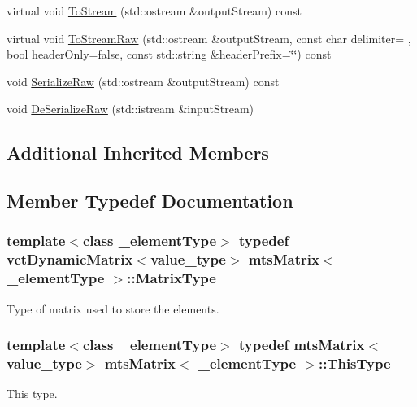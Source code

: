 \begin{DoxyCompactItemize}
virtual void \hyperlink{classmts_matrix_a87c2e010df3ccede587046196fa716fc}{To\+Stream} (std\+::ostream \&output\+Stream) const 
\item 
virtual void \hyperlink{classmts_matrix_a89f5816f6a704ffe48adc00edb8b3ef9}{To\+Stream\+Raw} (std\+::ostream \&output\+Stream, const char delimiter= \textquotesingle{} \textquotesingle{}, bool header\+Only=false, const std\+::string \&header\+Prefix=\char`\"{}\char`\"{}) const 
\item 
void \hyperlink{classmts_matrix_a49484e70fcf5261d86f962c6b1f2ce71}{Serialize\+Raw} (std\+::ostream \&output\+Stream) const 
\item 
void \hyperlink{classmts_matrix_aa079b220e4b5b4578c324a16e02d0eeb}{De\+Serialize\+Raw} (std\+::istream \&input\+Stream)
\end{DoxyCompactItemize}
\subsection*{Additional Inherited Members}


\subsection{Member Typedef Documentation}
\hypertarget{classmts_matrix_af0f57fd565d954a7485dcb26a384d64a}{}
\subsubsection[{Matrix\+Type}]{\setlength{\rightskip}{0pt plus 5cm}template$<$class \+\_\+element\+Type$>$ typedef {\bf vct\+Dynamic\+Matrix}$<$value\+\_\+type$>$ {\bf mts\+Matrix}$<$ \+\_\+element\+Type $>$\+::{\bf Matrix\+Type}}\label{classmts_matrix_af0f57fd565d954a7485dcb26a384d64a}
Type of matrix used to store the elements. \hypertarget{classmts_matrix_abebbde6e54b4a6e574c42a99bc015524}{}
\subsubsection[{This\+Type}]{\setlength{\rightskip}{0pt plus 5cm}template$<$class \+\_\+element\+Type$>$ typedef {\bf mts\+Matrix}$<$value\+\_\+type$>$ {\bf mts\+Matrix}$<$ \+\_\+element\+Type $>$\+::{\bf This\+Type}}\label{classmts_matrix_abebbde6e54b4a6e574c42a99bc015524}
This type. 

